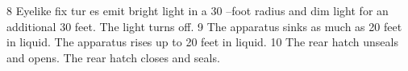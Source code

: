 8                                          Eyelike fix tur es emit  bright light in a 30 --foot  radius and dim light for  an additional 30 feet.                                The light turns off.                                                                                                                                
9                                          The apparatus sinks as  much as 20 feet in  liquid.                                                                                   The apparatus rises up  to 20 feet in liquid.                                                                                                       
10                                         The rear hatch unseals  and opens.                                                                                                    The rear hatch  closes  and seals.                                                                                                                  






